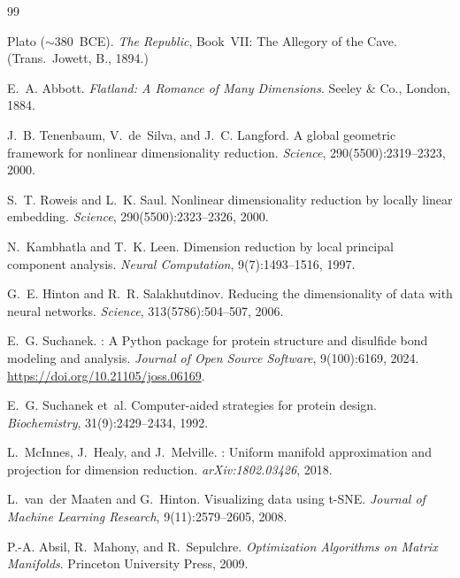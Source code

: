 \documentclass[12pt,letterpaper]{article}
\begin{document}
\begin{thebibliography}{99}

Plato ($\sim$380~BCE).
\newblock \emph{The Republic}, Book~VII: The Allegory of the Cave.
\newblock (Trans.\ Jowett, B., 1894.)

E.~A. Abbott.
\newblock \emph{Flatland: A Romance of Many Dimensions}.
\newblock Seeley \& Co., London, 1884.

J.~B. Tenenbaum, V.~de~Silva, and J.~C. Langford.
\newblock A global geometric framework for nonlinear dimensionality reduction.
\newblock \emph{Science}, 290(5500):2319--2323, 2000.

S.~T. Roweis and L.~K. Saul.
\newblock Nonlinear dimensionality reduction by locally linear embedding.
\newblock \emph{Science}, 290(5500):2323--2326, 2000.

N.~Kambhatla and T.~K. Leen.
\newblock Dimension reduction by local principal component analysis.
\newblock \emph{Neural Computation}, 9(7):1493--1516, 1997.

G.~E. Hinton and R.~R. Salakhutdinov.
\newblock Reducing the dimensionality of data with neural networks.
\newblock \emph{Science}, 313(5786):504--507, 2006.

E.~G. Suchanek.
: A {Python} package for protein structure and disulfide
  bond modeling and analysis.
\newblock \emph{Journal of Open Source Software}, 9(100):6169, 2024.
\newblock \url{https://doi.org/10.21105/joss.06169}.

E.~G. Suchanek et~al.
\newblock Computer-aided strategies for protein design.
\newblock \emph{Biochemistry}, 31(9):2429--2434, 1992.

L.~McInnes, J.~Healy, and J.~Melville.
: Uniform manifold approximation and projection for dimension
  reduction.
\newblock \emph{arXiv:1802.03426}, 2018.

L.~van~der Maaten and G.~Hinton.
\newblock Visualizing data using {t-SNE}.
\newblock \emph{Journal of Machine Learning Research}, 9(11):2579--2605, 2008.

P.-A. Absil, R.~Mahony, and R.~Sepulchre.
\newblock \emph{Optimization Algorithms on Matrix Manifolds}.
\newblock Princeton University Press, 2009.


\end{thebibliography}
\end{document}
